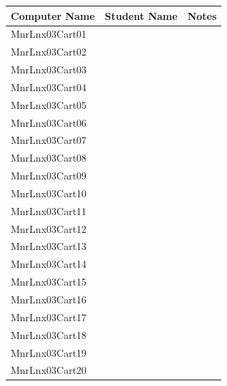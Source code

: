 \begin{tabular}{| l | p{7cm} | p{5cm} |}
        \hline
        \textbf{Computer Name} & \textbf{Student Name} & \textbf{Notes}\\ \hline
        MnrLnx03Cart01 & & \\ \hline
        MnrLnx03Cart02 & & \\ \hline
        MnrLnx03Cart03 & & \\ \hline
        MnrLnx03Cart04 & & \\ \hline
        MnrLnx03Cart05 & & \\ \hline
        MnrLnx03Cart06 & & \\ \hline
        MnrLnx03Cart07 & & \\ \hline
        MnrLnx03Cart08 & & \\ \hline
        MnrLnx03Cart09 & & \\ \hline
        MnrLnx03Cart10 & & \\ \hline
        MnrLnx03Cart11 & & \\ \hline
        MnrLnx03Cart12 & & \\ \hline
        MnrLnx03Cart13 & & \\ \hline
        MnrLnx03Cart14 & & \\ \hline
        MnrLnx03Cart15 & & \\ \hline
        MnrLnx03Cart16 & & \\ \hline
        MnrLnx03Cart17 & & \\ \hline
        MnrLnx03Cart18 & & \\ \hline
        MnrLnx03Cart19 & & \\ \hline
        MnrLnx03Cart20 & & \\ \hline
\end{tabular}
